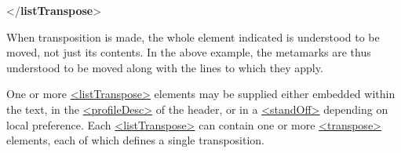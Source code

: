 \begin{shaded}
\hspace*{1em}\mbox{}\newline 
{}\mbox{}\newline 
{</\textbf{listTranspose}>}\end{shaded}\egroup\par \noindent  When transposition is made, the whole element indicated is understood to be moved, not just its contents. In the above example, the metamarks are thus understood to be moved along with the lines to which they apply.\par
One or more \hyperref[TEI.listTranspose]{<listTranspose>} elements may be supplied either embedded within the text, in the \hyperref[TEI.profileDesc]{<profileDesc>} of the header, or in a \hyperref[TEI.standOff]{<standOff>} depending on local preference. Each \hyperref[TEI.listTranspose]{<listTranspose>} can contain one or more \hyperref[TEI.transpose]{<transpose>} elements, each of which defines a single transposition.
